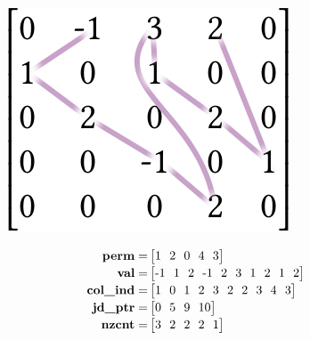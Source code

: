 \begin{figure}[p]
\hfill
\begin{minipage}[b]{0.3\linewidth}
\includegraphics[width=0.9\linewidth]{figures/jdsorder.png}
\end{minipage}
\hfill
\begin{minipage}[b]{0.65\linewidth}
\footnotesize
\begin{align*}
\text{\bf perm} =& \begin{bmatrix}1\ \ 2\ \ 0\ \ 4\ \ 3\\\end{bmatrix}\\[-0.75mm]
\text{\bf val} =& \begin{bmatrix}\text{-}1\ \ 1\ \ 2\ \ \text{-}1\ \ 2\ \ 3\ \ 1\ \ 2\ \ 1\ \ 2\\\end{bmatrix}\\[-0.75mm]
\text{\bf col\_ind} =& \begin{bmatrix}1\ \ 0\ \ 1\ \ 2\ \ 3\ \ 2\ \ 2\ \ 3\ \ 4\ \ 3\\\end{bmatrix}\\[-0.75mm]
\text{\bf jd\_ptr} =& \begin{bmatrix}0\ \ 5\ \ 9\ \ 10\\\end{bmatrix}\\[-0.75mm]
\text{\bf nzcnt} =& \begin{bmatrix}3\ \ 2\ \ 2\ \ 2\ \ 1\end{bmatrix}
\end{align*}
\end{minipage}
\hfill


\end{figure}
